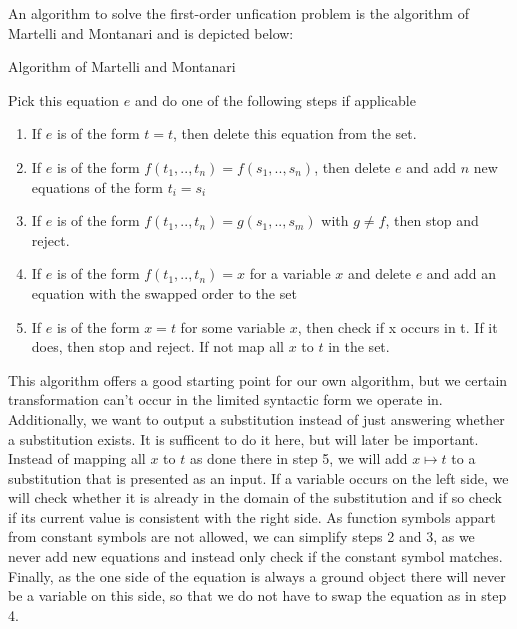 \documentclass{article}
\begin{document}
        An algorithm to solve the first-order unfication problem is the algorithm of Martelli and Montanari \cite{MartMont} and is depicted below:
        \begin{algorithm}
            \caption{Algorithm of Martelli and Montanari}
        \begin{algorithmic}
            \State Pick this equation $e$ and do one of the following steps if applicable
            \begin{enumerate}
                \item If $e$ is of the form $t = t$, then delete this equation from the set.
                \item If $e$ is of the form $f(t_1, .., t_n) = f(s_1,.., s_n)$, then delete $e$ and add $n$ new equations of the form $t_i = s_i$
                \item If $e$ is of the form $f(t_1, .., t_n) = g(s_1,.., s_m)$ with $g \neq f$, then stop and reject.
                \item If $e$ is of the form $f(t_1,..,t_n) = x$ for a variable $x$ and delete $e$ and add an equation with the swapped order to the set
                \item If $e$ is of the form $x=t$ for some variable $x$, then check if x occurs in t. If it does, then stop and reject. If not map all $x$ to $t$ in the set.
            \end{enumerate}
            \EndWhile
        \end{algorithmic}
        \end{algorithm}

        This algorithm offers a good starting point for our own algorithm, but we certain transformation can't occur in the limited syntactic form we operate in. Additionally, we want to output a substitution instead of just answering whether a substitution exists. It is sufficent to do it here, but will later be important. Instead of mapping all $x$ to $t$ as done there in step 5, we will add $x\mapsto t$ to a substitution that is presented as an input. If a variable occurs on the left side, we will check whether it is already in the domain of the substitution and if so check if its current value is consistent with the right side.
        As function symbols appart from constant symbols are not allowed, we can simplify steps 2 and 3, as we never add new equations and instead only check if the constant symbol matches. Finally, as the one side of the equation is always a ground object there will never be a variable on this side, so that we do not have to swap the equation as in step 4.
\end{document}
